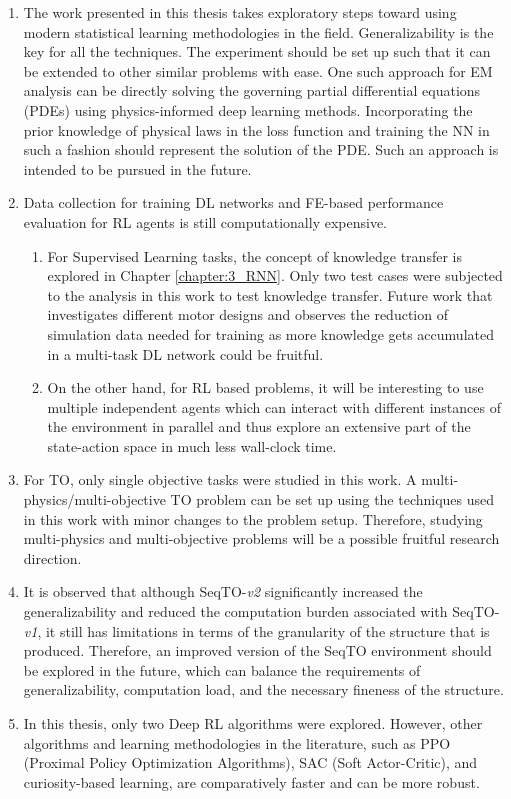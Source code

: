 \begin{enumerate}
    \item The work presented in this thesis takes exploratory steps toward using modern statistical learning methodologies in the field. Generalizability is the key for all the techniques. The experiment should be set up such that it can be extended to other similar problems with ease. One such approach for EM analysis can be directly solving the governing partial differential equations (PDEs) using physics-informed deep learning methods. Incorporating the prior knowledge of physical laws in the loss function and training the NN in such a fashion should represent the solution of the PDE. Such an approach is intended to be pursued in the future.

    \item Data collection for training DL networks and FE-based performance evaluation for RL agents is still computationally expensive. 
    \begin{enumerate}
        \item For Supervised Learning tasks, the concept of knowledge transfer is explored in Chapter \ref{chapter:3_RNN}. Only two test cases were subjected to the analysis in this work to test knowledge transfer. Future work that investigates different motor designs and observes the reduction of simulation data needed for training as more knowledge gets accumulated in a multi-task DL network could be fruitful.
        
        \item On the other hand, for RL based problems, it will be interesting to use multiple independent agents which can interact with different instances of the environment in parallel and thus explore an extensive part of the state-action space in much less wall-clock time.
    \end{enumerate}
    \item For TO, only single objective tasks were studied in this work. A multi-physics/multi-objective TO problem can be set up using the techniques used in this work with minor changes to the problem setup. Therefore, studying multi-physics and multi-objective problems will be a possible fruitful research direction. 
    
    \item It is observed that although SeqTO-\textit{v2} significantly increased the generalizability and reduced the computation burden associated with SeqTO-\textit{v1}, it still has limitations in terms of the granularity of the structure that is produced. Therefore, an improved version of the SeqTO environment should be explored in the future, which can balance the requirements of generalizability, computation load, and the necessary fineness of the structure.
    
    \item In this thesis, only two Deep RL algorithms were explored. However, other algorithms and learning methodologies in the literature, such as PPO (Proximal Policy Optimization Algorithms), SAC (Soft Actor-Critic), and curiosity-based learning, are comparatively faster and can be more robust.
\end{enumerate}

